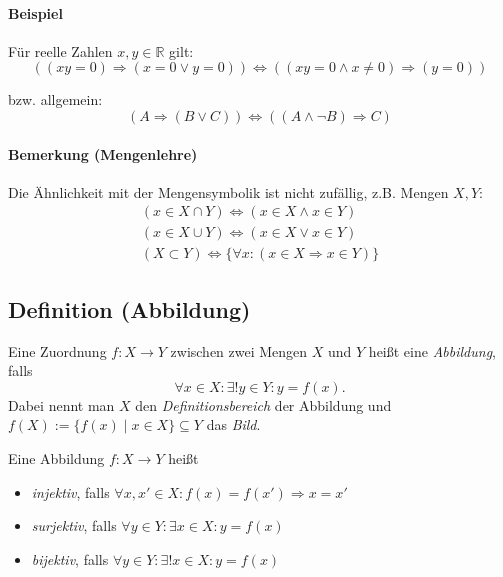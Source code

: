 \paragraph{Beispiel}
	Für reelle Zahlen $x,y\in\mathbb{R}$ gilt:
	\begin{equation*}
		\left((xy = 0)\Rightarrow (x=0 \lor y=0)\right) \Leftrightarrow \left((xy=0 \land x \neq 0)\Rightarrow (y =0)\right)
	\end{equation*}
	
	bzw. allgemein:
	\begin{equation*}
		(A\Rightarrow (B\lor C))\Leftrightarrow ((A\land\lnot B)\Rightarrow C)
	\end{equation*}

\paragraph{Bemerkung (Mengenlehre)}
	Die Ähnlichkeit mit der Mengensymbolik ist nicht zufällig, z.B. Mengen $X, Y$:
	\begin{gather*}
		(x\in X\cap Y)\Leftrightarrow (x\in X\land x\in Y)\\
		(x\in X\cup Y)\Leftrightarrow (x\in X\lor x\in Y)\\
		(X\subset Y) \Leftrightarrow \{\forall x : (x\in X \Rightarrow x\in Y)\}
	\end{gather*}

\subsection*{Definition (Abbildung)}
	\begin{Definition}[Abbildung]
		Eine Zuordnung $f: X\to Y$ zwischen zwei Mengen $X$ und $Y$ heißt eine \emph{Abbildung}, falls 
		\[\forall x\in X: \exists ! y\in Y: y=f(x).\]
	Dabei nennt man $X$ den \emph{Definitionsbereich} der Abbildung und $f(X):=\{f(x)\mid x\in X \}\subseteq Y$ das \emph{Bild}.

	Eine Abbildung $f: X\to Y$ heißt
	\begin{itemize}
		\item \emph{injektiv}, falls $\forall x,x'\in X:f(x) = f(x') \Rightarrow x=x'$
		\item \emph{surjektiv}, falls $\forall y\in Y:\exists x\in X: y = f(x)$
		\item \emph{bijektiv}, falls $\forall y\in Y:\exists !x\in X: y = f(x)$
	\end{itemize}
	\end{Definition}

